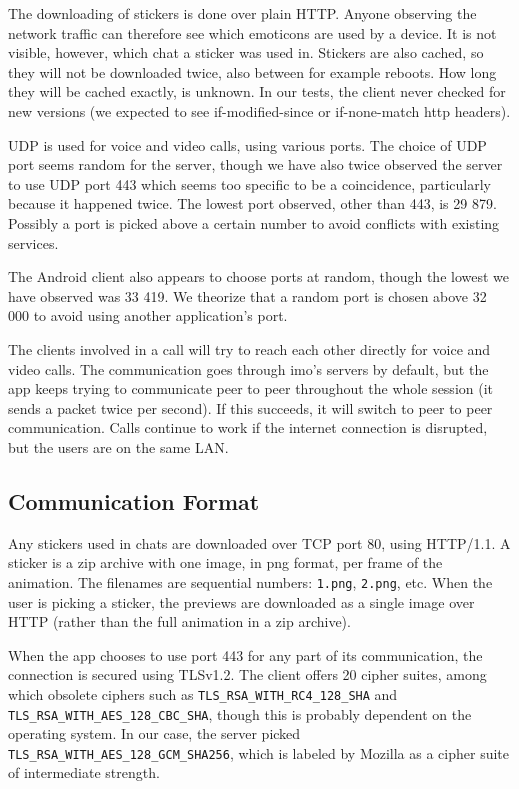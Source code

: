 \documentclass[conference]{IEEEtran}
\begin{document}
The downloading of stickers is done over plain HTTP. Anyone observing the
network traffic can therefore see which emoticons are used by a device. It is
not visible, however, which chat a sticker was used in. Stickers are also
cached, so they will not be downloaded twice, also between for example reboots.
How long they will be cached exactly, is unknown. In our tests, the client
never checked for new versions (we expected to see if-modified-since or
if-none-match http headers).

UDP is used for voice and video calls, using various ports. The choice of UDP
port seems random for the server, though we have also twice observed the server
to use UDP port 443 which seems too specific to be a coincidence, particularly
because it happened twice. The lowest port observed, other than 443, is 29 879.
Possibly a port is picked above a certain number to avoid conflicts with
existing services.

The Android client also appears to choose ports at random, though the lowest we
have observed was 33 419. We theorize that a random port is chosen above 32 000
to avoid using another application's port.

The clients involved in a call will try to reach each other directly for voice
and video calls. The communication goes through imo's servers by default, but
the app keeps trying to communicate peer to peer throughout the whole session
(it sends a packet twice per second). If this succeeds, it will switch to peer
to peer communication. Calls continue to work if the internet connection is
disrupted, but the users are on the same LAN.


\subsection{Communication Format}

Any stickers used in chats are downloaded over TCP port 80, using HTTP/1.1. A
sticker is a zip archive with one image, in png format, per frame of the
animation. The filenames are sequential numbers: \texttt{1.png}, \texttt{2.png},
etc. When the user is picking a sticker, the previews are downloaded as a single
image over HTTP (rather than the full animation in a zip archive).

When the app chooses to use port 443 for any part of its communication, the
connection is secured using TLSv1.2. The client offers 20 cipher suites, among
which obsolete ciphers such as \texttt{TLS\_RSA\_WITH\_RC4\_128\_SHA} and
\texttt{TLS\_RSA\_WITH\_AES\_128\_CBC\_SHA}, though this is probably dependent
on the operating system. In our case, the server picked
\texttt{TLS\_RSA\_WITH\_AES\_128\_GCM\_SHA256}, which is labeled by Mozilla as a
cipher suite of intermediate strength\cite{moz-tls}.
\end{document}
